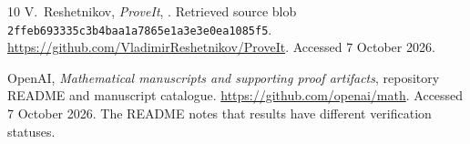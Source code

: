\documentclass[11pt,a4paper]{article}
\numberwithin{equation}{section}
\theoremstyle{definition}\newtheorem{definition}[theorem]{Definition}
\theoremstyle{remark}\newtheorem{remark}[theorem]{Remark}
\begin{document}
\begin{thebibliography}{10}
V.~Reshetnikov, \emph{ProveIt},
.
Retrieved source blob \texttt{2ffeb693335c3b4baa1a7865e1a3e3e0ea1085f5}.
\url{https://github.com/VladimirReshetnikov/ProveIt}. Accessed 7 October 2026.

OpenAI, \emph{Mathematical manuscripts and supporting proof artifacts},
repository README and manuscript catalogue.
\url{https://github.com/openai/math}. Accessed 7 October 2026.
The README notes that results have different verification statuses.
\end{thebibliography}
\end{document}

